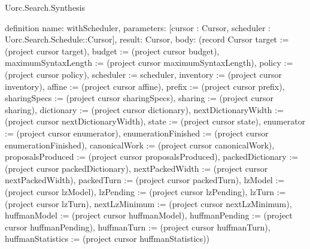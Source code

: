 \begin{lexlean}{Uorc.Search.Synthesis}
\begin{semanticmodule}
definition{
  name: withScheduler,
  parameters: [cursor : Cursor, scheduler : Uorc.Search.Schedule::Cursor],
  result: Cursor,
  body: (record Cursor {target := (project cursor target), budget := (project cursor budget), maximumSyntaxLength := (project cursor maximumSyntaxLength), policy := (project cursor policy), scheduler := scheduler, inventory := (project cursor inventory), affine := (project cursor affine), prefix := (project cursor prefix), sharingSpecs := (project cursor sharingSpecs), sharing := (project cursor sharing), dictionary := (project cursor dictionary), nextDictionaryWidth := (project cursor nextDictionaryWidth), state := (project cursor state), enumerator := (project cursor enumerator), enumerationFinished := (project cursor enumerationFinished), canonicalWork := (project cursor canonicalWork), proposalsProduced := (project cursor proposalsProduced), packedDictionary := (project cursor packedDictionary), nextPackedWidth := (project cursor nextPackedWidth), packedTurn := (project cursor packedTurn), lzModel := (project cursor lzModel), lzPending := (project cursor lzPending), lzTurn := (project cursor lzTurn), nextLzMinimum := (project cursor nextLzMinimum), huffmanModel := (project cursor huffmanModel), huffmanPending := (project cursor huffmanPending), huffmanTurn := (project cursor huffmanTurn), huffmanStatistics := (project cursor huffmanStatistics)})
}


\end{semanticmodule}
\end{lexlean}
